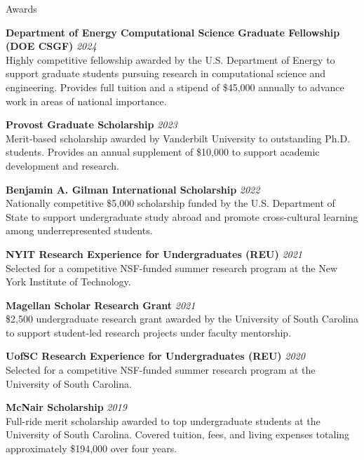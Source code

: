 \documentclass{resume}
\begin{document}

\begin{rSection}{Awards}

\textbf{Department of Energy Computational Science Graduate Fellowship (DOE CSGF)} \hfill \emph{2024} \\
Highly competitive fellowship awarded by the U.S. Department of Energy to support graduate students pursuing research in computational science and engineering. Provides full tuition and a stipend of \$45,000 annually to advance work in areas of national importance.

\textbf{Provost Graduate Scholarship} \hfill \emph{2023} \\
Merit-based scholarship awarded by Vanderbilt University to outstanding Ph.D. students. Provides an annual supplement of \$10,000 to support academic development and research.

\textbf{Benjamin A. Gilman International Scholarship} \hfill \emph{2022} \\
Nationally competitive \$5,000 scholarship funded by the U.S. Department of State to support undergraduate study abroad and promote cross-cultural learning among underrepresented students.

\textbf{NYIT Research Experience for Undergraduates (REU)} \hfill \emph{2021} \\
Selected for a competitive NSF-funded summer research program at the New York Institute of Technology.

\textbf{Magellan Scholar Research Grant} \hfill \emph{2021} \\
\$2,500 undergraduate research grant awarded by the University of South Carolina to support student-led research projects under faculty mentorship.

\textbf{UofSC Research Experience for Undergraduates (REU)} \hfill \emph{2020} \\
Selected for a competitive NSF-funded summer research program at the University of South Carolina.

\textbf{McNair Scholarship} \hfill \emph{2019} \\
Full-ride merit scholarship awarded to top undergraduate students at the University of South Carolina. Covered tuition, fees, and living expenses totaling approximately \$194,000 over four years.

\end{rSection}
\end{document}
